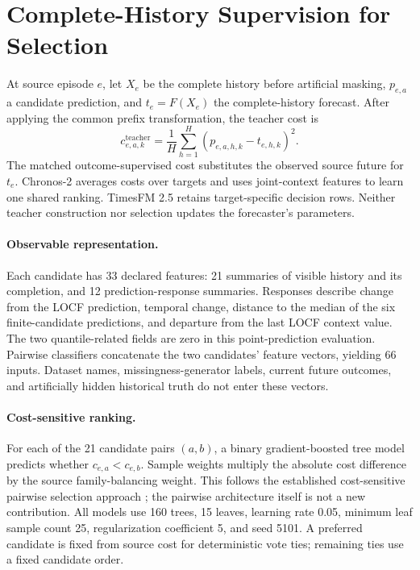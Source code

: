 \documentclass{article}
\begin{document}
\section{Complete-History Supervision for Selection}

At source episode $e$, let $X_e$ be the complete history before artificial masking, $p_{e,a}$ a candidate prediction, and $t_e=F(X_e)$ the complete-history forecast. After applying the common prefix transformation, the teacher cost is
\begin{equation}
 c^{\mathrm{teacher}}_{e,a,k}
 =\frac1H\sum_{h=1}^H(p_{e,a,h,k}-t_{e,h,k})^2.
 \label{eq:teacher}
\end{equation}
The matched outcome-supervised cost substitutes the observed source future for $t_e$. Chronos-2 averages costs over targets and uses joint-context features to learn one shared ranking. TimesFM 2.5 retains target-specific decision rows. Neither teacher construction nor selection updates the forecaster's parameters.

\paragraph{Observable representation.}
Each candidate has 33 declared features: 21 summaries of visible history and its completion, and 12 prediction-response summaries. Responses describe change from the LOCF prediction, temporal change, distance to the median of the six finite-candidate predictions, and departure from the last LOCF context value. The two quantile-related fields are zero in this point-prediction evaluation. Pairwise classifiers concatenate the two candidates' feature vectors, yielding 66 inputs. Dataset names, missingness-generator labels, current future outcomes, and artificially hidden historical truth do not enter these vectors.

\paragraph{Cost-sensitive ranking.}
For each of the 21 candidate pairs $(a,b)$, a binary gradient-boosted tree model predicts whether $c_{e,a}<c_{e,b}$. Sample weights multiply the absolute cost difference by the source family-balancing weight. This follows the established cost-sensitive pairwise selection approach \citep{xu2012evaluating}; the pairwise architecture itself is not a new contribution. All models use 160 trees, 15 leaves, learning rate 0.05, minimum leaf sample count 25, regularization coefficient 5, and seed 5101. A preferred candidate is fixed from source cost for deterministic vote ties; remaining ties use a fixed candidate order.
\end{document}
